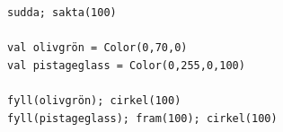   

\begin{lstlisting}[basicstyle={\ttfamily\fontsize{16}{19}\selectfont},numbers=none]
sudda; sakta(100)      

val olivgrön = Color(0,70,0)
val pistageglass = Color(0,255,0,100)

fyll(olivgrön); cirkel(100)
fyll(pistageglass); fram(100); cirkel(100)
\end{lstlisting}
        

